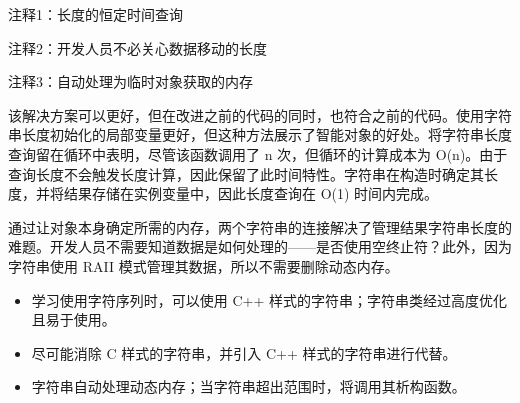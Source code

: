 {\footnotesize
注释1：长度的恒定时间查询

注释2：开发人员不必关心数据移动的长度

注释3：自动处理为临时对象获取的内存
}

该解决方案可以更好，但在改进之前的代码的同时，也符合之前的代码。使用字符串长度初始化的局部变量更好，但这种方法展示了智能对象的好处。将字符串长度查询留在循环中表明，尽管该函数调用了 n 次，但循环的计算成本为 O(n)。由于查询长度不会触发长度计算，因此保留了此时间特性。字符串在构造时确定其长度，并将结果存储在实例变量中，因此长度查询在 O(1) 时间内完成。

通过让对象本身确定所需的内存，两个字符串的连接解决了管理结果字符串长度的难题。开发人员不需要知道数据是如何处理的——是否使用空终止符？此外，因为字符串使用 RAII 模式管理其数据，所以不需要删除动态内存。


\begin{itemize}
\item
学习使用字符序列时，可以使用 C++ 样式的字符串；字符串类经过高度优化且易于使用。

\item
尽可能消除 C 样式的字符串，并引入 C++ 样式的字符串进行代替。

\item
字符串自动处理动态内存；当字符串超出范围时，将调用其析构函数。
\end{itemize}
